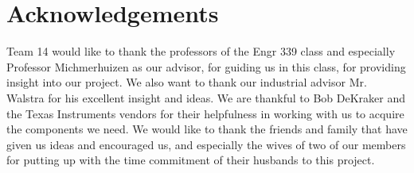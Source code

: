 \documentclass[ppfs.tex]{template/subfiles}
\begin{document}
\section{Acknowledgements}

Team 14 would like to thank the professors of the Engr 339 class and especially Professor Michmerhuizen as our advisor, for guiding us in this class, for providing insight into our project. We also want to thank our industrial advisor Mr. Walstra for his excellent insight and ideas.
We are thankful to Bob DeKraker and the Texas Instruments vendors for their helpfulness in working with us to acquire the components we need.
We would like to thank the friends and family that have given us ideas and encouraged us, and especially the wives of two of our members for putting up with the time commitment of their husbands to this project.
\end{document}

